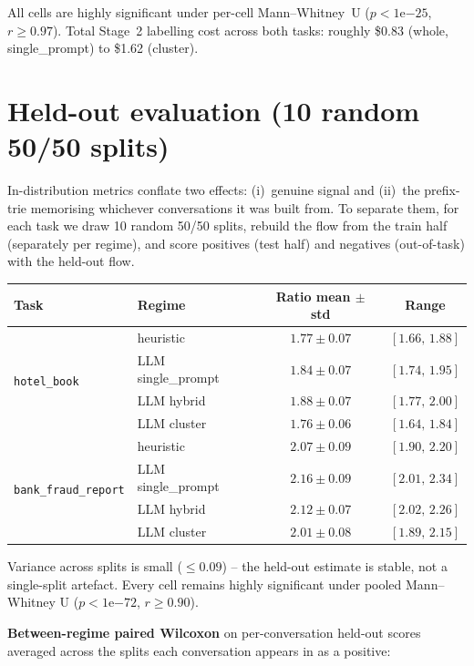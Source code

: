 \documentclass[11pt,a4paper]{article}
\begin{document}
All cells are highly significant under per-cell Mann--Whitney~U ($p < 1\mathrm{e}{-25}$, $r \geq 0.97$). Total Stage~2 labelling cost across both tasks: roughly \$0.83 (whole, single\_prompt) to \$1.62 (cluster).

\section{Held-out evaluation (10 random 50/50 splits)}

In-distribution metrics conflate two effects: (i)~genuine signal and (ii)~the prefix-trie memorising whichever conversations it was built from. To separate them, for each task we draw 10 random 50/50 splits, rebuild the flow from the train half (separately per regime), and score positives (test half) and negatives (out-of-task) with the held-out flow.

\begin{center}
\begin{tabular}{llcc}
\toprule
Task & Regime & Ratio mean $\pm$ std & Range \\
\midrule
\multirow{4}{*}{\texttt{hotel\_book}}
  & heuristic            & $1.77 \pm 0.07$ & $[1.66,\,1.88]$ \\
  & LLM single\_prompt   & $1.84 \pm 0.07$ & $[1.74,\,1.95]$ \\
  & LLM hybrid           & $1.88 \pm 0.07$ & $[1.77,\,2.00]$ \\
  & LLM cluster          & $1.76 \pm 0.06$ & $[1.64,\,1.84]$ \\
\midrule
\multirow{4}{*}{\texttt{bank\_fraud\_report}}
  & heuristic            & $2.07 \pm 0.09$ & $[1.90,\,2.20]$ \\
  & LLM single\_prompt   & $2.16 \pm 0.09$ & $[2.01,\,2.34]$ \\
  & LLM hybrid           & $2.12 \pm 0.07$ & $[2.02,\,2.26]$ \\
  & LLM cluster          & $2.01 \pm 0.08$ & $[1.89,\,2.15]$ \\
\bottomrule
\end{tabular}
\end{center}

Variance across splits is small ($\leq 0.09$) -- the held-out estimate is stable, not a single-split artefact. Every cell remains highly significant under pooled Mann--Whitney U ($p < 1\mathrm{e}{-72}$, $r \geq 0.90$).

\textbf{Between-regime paired Wilcoxon} on per-conversation held-out scores averaged across the splits each conversation appears in as a positive:
\end{document}
